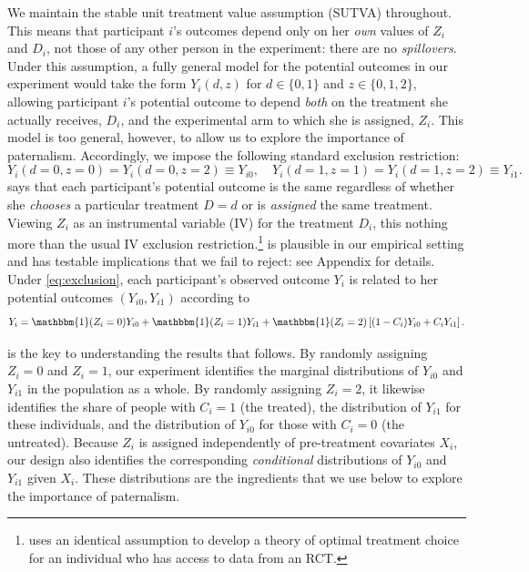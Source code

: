 \documentclass[oneside,11pt]{article}
\begin{document}
We maintain the stable unit treatment value assumption (SUTVA) throughout. This means that participant $i$'s outcomes depend only on her \emph{own} values of $Z_i$ and $D_i$, not those of any other person in the experiment: there are no \emph{spillovers}. Under this assumption, a fully general model for the potential outcomes in our experiment would take the form $Y_i(d, z)$ for $d\in \{0,1\}$ and $z \in \{0, 1, 2\}$, allowing participant $i$'s potential outcome to depend \emph{both} on the treatment she actually receives, $D_i$, and the experimental arm to which she is assigned, $Z_i$. This model is too general, however, to allow us to explore the importance of paternalism. Accordingly, we impose the following standard exclusion restriction:
\begin{equation}
Y_i(d=0, z=0) = Y_i(d=0, z=2) \equiv Y_{i0}, \quad
Y_i(d=1, z=1) = Y_i(d=1, z=2) \equiv Y_{i1}.
\label{eq:exclusion}
\end{equation}
 says that each participant's potential outcome is the same regardless of whether she \emph{chooses} a particular treatment $D=d$ or is \emph{assigned} the same treatment. Viewing $Z_i$ as an instrumental variable (IV) for the treatment $D_i$, this nothing more than the usual IV exclusion restriction.\footnote{\cite{chamberlain2011bayesian} uses an identical assumption to develop a theory of optimal treatment choice for an individual who has access to data from an RCT.}  is plausible in our empirical setting and has testable implications that we fail to reject: see Appendix  for details. Under \eqref{eq:exclusion}, each participant's observed outcome $Y_i$ is related to her potential outcomes $(Y_{i0}, Y_{i1})$ according to 
\begin{equation}
    Y_i = \mathbbm{1}(Z_i =0) Y_{i0} + \mathbbm{1}(Z_i = 1)  Y_{i1}  + \mathbbm{1}(Z_i = 2) \left[(1 - C_i) Y_{i0} + C_i Y_{i1} \right].
\label{eq:potentialOutcomes}
\end{equation}

 is the key to understanding the results that follows. By randomly assigning $Z_i=0$ and $Z_i = 1$, our experiment identifies the marginal distributions of $Y_{i0}$ and $Y_{i1}$ in the population as a whole. By randomly assigning $Z_i=2$, it likewise identifies the share of people with $C_i = 1$ (the treated), the distribution of $Y_{i1}$ for these individuals, and the distribution of $Y_{i0}$ for those with $C_i = 0$ (the untreated). Because $Z_i$ is assigned independently of pre-treatment covariates $X_i$, our design also identifies the corresponding \emph{conditional} distributions of $Y_{i0}$ and $Y_{i1}$ given $X_i$. These distributions are the ingredients that we use below to explore the importance of paternalism. 
\end{document}

